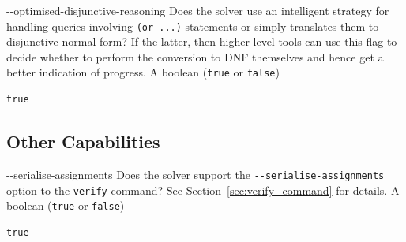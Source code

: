 \clOutputOption
{{-}-optimised-disjunctive-reasoning}
{Does the solver use an intelligent strategy for handling queries involving \texttt{(or ...)} statements or simply translates them to disjunctive normal form? If the latter, then higher-level tools can use this flag to decide whether to perform the conversion to DNF themselves and hence get a better indication of progress.
}
{A boolean (\texttt{true} or \texttt{false})}
\begin{lstlisting}[style=bash]
%*\exampleSolver* supports --optimised-disjunctive-reasoning
true
\end{lstlisting}

\subsection{Other Capabilities}
\label{sec:other-capabilities}

\clOutputOption
{{-}-serialise-assignments}
{Does the solver support the \texttt{{-}-serialise-assignments} option to the \texttt{verify} command? See Section~\ref{sec:verify_command} for details.}
{A boolean (\texttt{true} or \texttt{false})}
\begin{lstlisting}[style=bash]
%*\exampleSolver* supports --serialise-assignments
true
\end{lstlisting}




